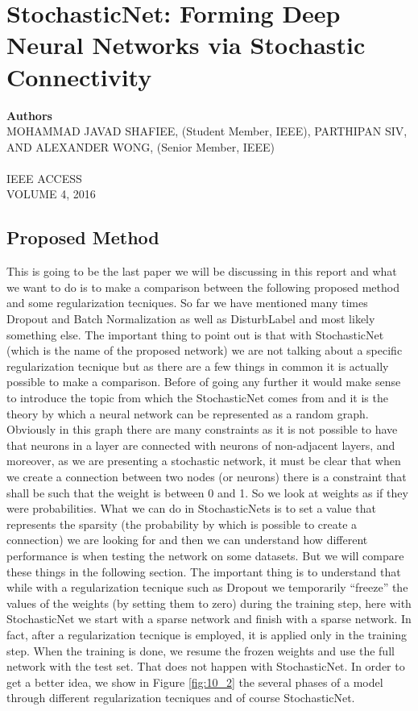 \chapter{StochasticNet: Forming Deep Neural Networks via Stochastic Connectivity}

{\small \textbf{Authors}\\
MOHAMMAD JAVAD SHAFIEE, (Student Member, IEEE), PARTHIPAN SIV, AND ALEXANDER WONG, (Senior Member, IEEE)\\ \\
IEEE ACCESS\\VOLUME 4, 2016}

\section{Proposed Method}

This is going to be the last paper we will be discussing in this report and what we want to do is to make a comparison between the following proposed method and some regularization tecniques. So far we have mentioned many times Dropout and Batch Normalization as well as DisturbLabel and most likely something else. The important thing to point out is that with StochasticNet (which is the name of the proposed network) we are not talking about a specific regularization tecnique but as there are a few things in common it is actually possible to make a comparison. Before of going any further it would make sense to introduce the topic from which the StochasticNet comes from and it is the theory by which a neural network can be represented as a random graph. Obviously in this graph there are many constraints as it is not possible to have that neurons in a layer are connected with neurons of non-adjacent layers, and moreover, as we are presenting a stochastic network, it must be clear that when we create a connection between two nodes (or neurons) there is a constraint that shall be such that the weight is between 0 and 1. So we look at weights as if they were probabilities. What we can do in StochasticNets is to set a value that represents the sparsity (the probability by which is possible to create a connection) we are looking for and then we can understand how different performance is when testing the network on some datasets. But we will compare these things in the following section. The important thing is to understand that while with a regularization tecnique such as Dropout we temporarily ``freeze'' the values of the weights (by setting them to zero) during the training step, here with StochasticNet we start with a sparse network and finish with a sparse network. In fact, after a regularization tecnique is employed, it is applied only in the training step. When the training is done, we resume the frozen weights and use the full network with the test set. That does not happen with StochasticNet. In order to get a better idea, we show in Figure \ref{fig:10_2} the several phases of a model through different regularization tecniques and of course StochasticNet.\\


